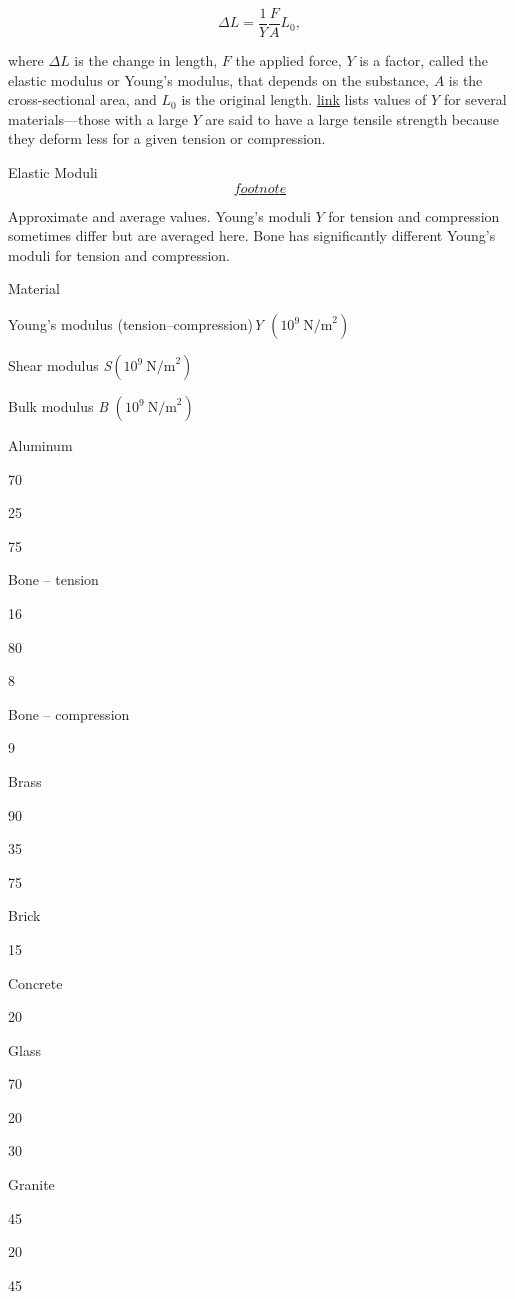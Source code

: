 \documentclass[
]{book}
\begin{document}
\leavevmode\hypertarget{eip-511}{}%
\[{{{\Delta L = \frac{1}{Y}}\frac{F}{A}L_{0}},}{}\]

where \({\Delta L}{}\) is the change in length, \(F{}\) the applied force,
\emph{}\(Y{}\) is a factor, called the elastic
modulus or Young's modulus, that depends on the substance,
\emph{}\(A{}\) is the cross-sectional area, and
\emph{}\(L_{0}{}\) is the original length.
\protect\hyperlink{import-auto-id1165298671576}{link} lists
values of \emph{\(Y{}\)} for several materials---those with a large \(Y{}\) are
said to have a large {tensile strength} because they
deform less for a given tension or compression.

{Elastic Moduli\protect\hyperlink{eip-id1325742}{\[footnote\]}}

Approximate and average values. Young's moduli \(Y{}\) for tension and
compression sometimes differ but are averaged here. Bone has
significantly different Young's moduli for tension and compression.

Material

Young's modulus (tension--compression)\emph{Y}
\((\text{10}^{\text{9}}\ \text{N/m}^{\text{2}})\)

Shear modulus \emph{S}\((\text{10}^{\text{9}}\ \text{N/m}^{\text{2}})\)

Bulk modulus \emph{B} \((\text{10}^{\text{9}}\ \text{N/m}^{\text{2}})\)

Aluminum

70

25

75

Bone -- tension

16

80

8

Bone -- compression

9

Brass

90

35

75

Brick

15

Concrete

20

Glass

70

20

30

Granite

45

20

45
\end{document}
